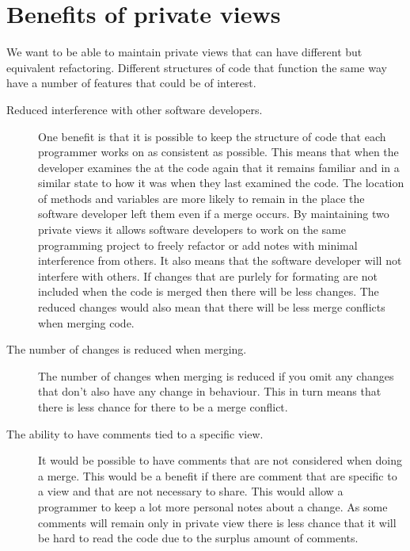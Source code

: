 
\section{Benefits of private views}
We want to be able to maintain private views that can have different but equivalent refactoring. Different structures of code that function the same way have a number of features that could be of interest.

\begin{description}

\item [Reduced interference with other software developers.]   
One benefit is that it is possible to keep the structure of code that each programmer works on as consistent as possible.  This means that when the developer examines the at the code again that it remains familiar and in a similar state to how it was when they last examined the code. The location of methods and variables are more likely to remain in the place the software developer left them even if a merge occurs.
By maintaining two private views it allows software developers to work on the same programming project to freely refactor or add notes with minimal interference from others.
It also means that the software developer will not interfere with others.
If changes that are purlely for formating are not included when the code is merged then there will be less changes.
The reduced changes would also mean that there will be less merge conflicts when merging code.
  
\item [The number of changes is reduced when merging.] 
The number of changes when merging is reduced if you omit any changes that don't also have any change in behaviour.  This in turn means that there is less chance for there to be a merge conflict.
  
\item [The ability to have comments tied to a specific view.] 
It would be possible to have comments that are not considered when doing a merge. This would be a benefit if there are comment that are specific to a view and that are not necessary to share.  This would allow a programmer to keep a lot more personal notes about a change.  As some comments will remain only in private view there is less chance that it will be hard to read the code due to the surplus amount of comments. 

\end{description}

